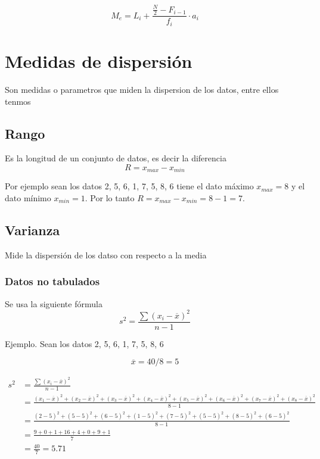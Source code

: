 \documentclass[
  11pt,
]{krantz}
\theoremstyle{definition}
\theoremstyle{definition}
\theoremstyle{definition}
\theoremstyle{definition}
\theoremstyle{remark}
\begin{document}
\[  M_e=L_{i}+\frac{\frac{N}{2}-F_{i-1}}{f_{i}}\cdot a_{i}\]

\hypertarget{medidas-de-dispersiuxf3n}{%
\chapter{Medidas de dispersión}\label{medidas-de-dispersiuxf3n}}

Son medidas o parametros que miden la dispersion de los datos, entre ellos tenmos

\hypertarget{rango}{%
\section{Rango}\label{rango}}

Es la longitud de un conjunto de datos, es decir la diferencia
\[R=x_{max}-x_{min}\]

Por ejemplo sean los datos 2, 5, 6, 1, 7, 5, 8, 6
tiene el dato máximo \(x_{max}=8\) y el dato mínimo \(x_{min}=1\). Por lo tanto \(R=x_{max}-x_{min}=8-1=7.\)

\hypertarget{varianza}{%
\section{Varianza}\label{varianza}}

Mide la dispersión de los datso con respecto a la media

\hypertarget{datos-no-tabulados}{%
\subsection{Datos no tabulados}\label{datos-no-tabulados}}

Se usa la siguiente fórmula
\[s^2=\frac{\sum\left(x_i-\overline{x}\right )^2}{n-1}\]

Ejemplo. Sean los datos 2, 5, 6, 1, 7, 5, 8, 6

\[\overline{x}=40/8=5\]

\[
\begin{aligned}
s^2&=\frac{\sum\left(x_i-\overline{x}\right )^2}{n-1}\\
&=\frac{\left(x_1-\overline{x}\right )^2+\left(x_2-\overline{x}\right )^2+\left(x_3-\overline{x}\right )^2+\left(x_4-\overline{x}\right )^2+\left(x_5-\overline{x}\right )^2+\left(x_6-\overline{x}\right )^2+\left(x_7-\overline{x}\right )^2+\left(x_8-\overline{x}\right )^2}{8-1}\\
&=\frac{\left(2-5\right )^2+\left(5-5\right )^2+\left(6-5\right )^2+\left(1-5\right )^2+\left(7-5\right )^2+\left(5-5\right )^2+\left(8-5\right )^2+\left(6-5\right )^2}{8-1}\\
&=\frac{9+0+1+16+4+0+9+1}{7}\\
&=\frac{40}{7}=5.71
\end{aligned}
\]
\end{document}
